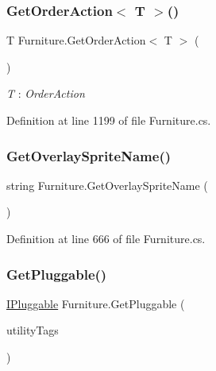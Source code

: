 \subsubsection{\texorpdfstring{Get\+Order\+Action$<$ T $>$()}{GetOrderAction< T >()}}
{\footnotesize\ttfamily T Furniture.\+Get\+Order\+Action$<$ T $>$ (\begin{DoxyParamCaption}{ }\end{DoxyParamCaption})}

\begin{Desc}
\item[Type Constraints]\begin{description}
\item[{\em T} : {\em Order\+Action}]\end{description}
\end{Desc}


Definition at line 1199 of file Furniture.\+cs.

\mbox{\label{class_furniture_a841c1151284cf19735791658688fd77d}} 
\subsubsection{\texorpdfstring{Get\+Overlay\+Sprite\+Name()}{GetOverlaySpriteName()}}
{\footnotesize\ttfamily string Furniture.\+Get\+Overlay\+Sprite\+Name (\begin{DoxyParamCaption}{ }\end{DoxyParamCaption})}



Definition at line 666 of file Furniture.\+cs.

\mbox{\label{class_furniture_ac28ca12fba747625e26a10382ed47c84}} 
\subsubsection{\texorpdfstring{Get\+Pluggable()}{GetPluggable()}}
{\footnotesize\ttfamily \hyperlink{interface_project_porcupine_1_1_power_network_1_1_i_pluggable}{I\+Pluggable} Furniture.\+Get\+Pluggable (\begin{DoxyParamCaption}\item[{Hash\+Set$<$ string $>$}]{utility\+Tags }\end{DoxyParamCaption})}



